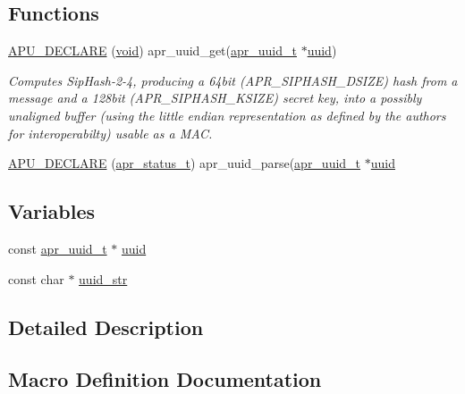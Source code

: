 \subsection*{Functions}
\begin{DoxyCompactItemize}
\item 
\hyperlink{group__APR__UUID_ga522039e1c51ab8ad1a7215fcc1023a46}{A\+P\+U\+\_\+\+D\+E\+C\+L\+A\+RE} (\hyperlink{group__MOD__ISAPI_gacd6cdbf73df3d9eed42fa493d9b621a6}{void}) apr\+\_\+uuid\+\_\+get(\hyperlink{structapr__uuid__t}{apr\+\_\+uuid\+\_\+t} $\ast$\hyperlink{group__APR__UUID_ga9b3f6ae7758c034f843487ac8ed248c2}{uuid})
\begin{DoxyCompactList}\small\item\em Computes Sip\+Hash-\/2-\/4, producing a 64bit (A\+P\+R\+\_\+\+S\+I\+P\+H\+A\+S\+H\+\_\+\+D\+S\+I\+ZE) hash from a message and a 128bit (A\+P\+R\+\_\+\+S\+I\+P\+H\+A\+S\+H\+\_\+\+K\+S\+I\+ZE) secret key, into a possibly unaligned buffer (using the little endian representation as defined by the authors for interoperabilty) usable as a M\+AC. \end{DoxyCompactList}\item 
\hyperlink{group__APR__UUID_ga7c5ef153448c46b4e52f7c9ee93879d6}{A\+P\+U\+\_\+\+D\+E\+C\+L\+A\+RE} (\hyperlink{group__apr__errno_gaa5105fa83cc322f09382292db8b47593}{apr\+\_\+status\+\_\+t}) apr\+\_\+uuid\+\_\+parse(\hyperlink{structapr__uuid__t}{apr\+\_\+uuid\+\_\+t} $\ast$\hyperlink{group__APR__UUID_ga9b3f6ae7758c034f843487ac8ed248c2}{uuid}
\end{DoxyCompactItemize}
\subsection*{Variables}
\begin{DoxyCompactItemize}
\item 
const \hyperlink{structapr__uuid__t}{apr\+\_\+uuid\+\_\+t} $\ast$ \hyperlink{group__APR__UUID_ga9b3f6ae7758c034f843487ac8ed248c2}{uuid}
\item 
const char $\ast$ \hyperlink{group__APR__UUID_ga43024131bfac4b8508fee85d0a41665d}{uuid\+\_\+str}
\end{DoxyCompactItemize}


\subsection{Detailed Description}


\subsection{Macro Definition Documentation}
